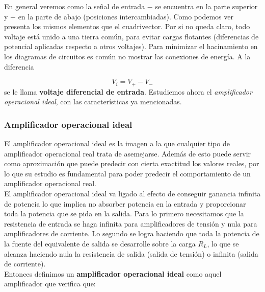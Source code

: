 \documentclass[12pt,a4paper]{article}
\numberwithin{equation}{section}
\numberwithin{figure}{section}
\begin{document}
En general veremos como la señal de entrada $-$ se encuentra en la parte superior y $+$ en la parte de abajo (posiciones intercambiadas). Como podemos ver presenta los mismos elementos que el cuadrivector. Por si no queda claro, todo voltaje está unido a una tierra común, para evitar cargas flotantes (diferencias de potencial aplicadas respecto a otros voltajes). Para minimizar el hacinamiento en los diagramas de circuitos es común no mostrar las conexiones de energía. A la diferencia

\begin{equation}
V_i = V_+ - V_-
\end{equation}
se le llama \textbf{voltaje diferencial de entrada}. Estudiemos ahora el \textit{amplificador operacional ideal}, con las características ya mencionadas.

\subsubsection{Amplificador operacional ideal}
El amplificador operacional ideal es la imagen a la que cualquier tipo de amplificador operacional real trata de asemejarse. Además de esto puede servir como aproximación que puede predecir con cierta exactitud los valores reales, por lo que su estudio es fundamental para poder predecir el comportamiento de un amplificador operacional real. \\

El amplificador operacional ideal va ligado al efecto de conseguir ganancia infinita de potencia lo que implica no absorber potencia en la entrada y proporcionar toda la potencia que se pida en la salida. Para lo primero necesitamos que la resistencia de entrada se haga infinita para amplificadores de tensión y nula para amplificadores de corriente. Lo segundo se logra haciendo que toda la potencia de la fuente del equivalente de salida se desarrolle sobre la carga $R_L$, lo que se alcanza haciendo nula la resistencia de salida (salida de tensión) o infinita (salida de corriente). \\

Entonces definimos un \textbf{amplificador operacional ideal} como aquel amplificador que verifica que:
\end{document}
